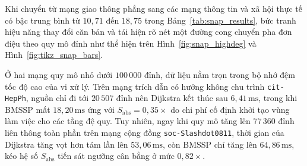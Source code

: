 \documentclass[12pt,a4paper,openany,oneside]{report}
\theoremstyle{plain}
\numberwithin{equation}{section}
\begin{document}
Khi chuyển từ mạng giao thông phẳng sang các mạng thông tin và xã hội thực tế có bậc trung bình từ $10{,}71$ đến $18{,}75$ trong Bảng~\ref{tab:snap_results}, bức tranh hiệu năng thay đổi căn bản và tái hiện rõ nét một đường cong chuyển pha đơn điệu theo quy mô đỉnh như thể hiện trên Hình~\ref{fig:snap_highdeg} và Hình~\ref{fig:tikz_snap_bars}.

\begin{table}[!htb]
\centering
{}
\caption{Thời gian giải trung vị tính bằng ms và hệ số tăng tốc trên 5 mạng thực tế bậc cao từ kho dữ liệu Stanford SNAP.}
\label{tab:snap_results}
\end{table}

Ở hai mạng quy mô nhỏ dưới $100\,000$ đỉnh, dữ liệu nằm trọn trong bộ nhớ đệm tốc độ cao của vi xử lý. Trên mạng trích dẫn có hướng không chu trình \texttt{cit-HepPh}, nguồn chỉ đi tới $20\,507$ đỉnh nên Dijkstra kết thúc sau $6{,}41\,\mathrm{ms}$, trong khi BMSSP mất $18{,}20\,\mathrm{ms}$ ứng với $S_{\mathrm{abs}} = 0{,}35\times$ do chi phí cố định khởi tạo vùng làm việc cho các tầng đệ quy. Tuy nhiên, ngay khi quy mô tăng lên $77\,360$ đỉnh liên thông toàn phần trên mạng cộng đồng \texttt{soc-Slashdot0811}, thời gian của Dijkstra tăng vọt hơn tám lần lên $53{,}06\,\mathrm{ms}$, còn BMSSP chỉ tăng lên $64{,}86\,\mathrm{ms}$, kéo hệ số $S_{\mathrm{abs}}$ tiến sát ngưỡng cân bằng ở mức $0{,}82\times$.
\end{document}
